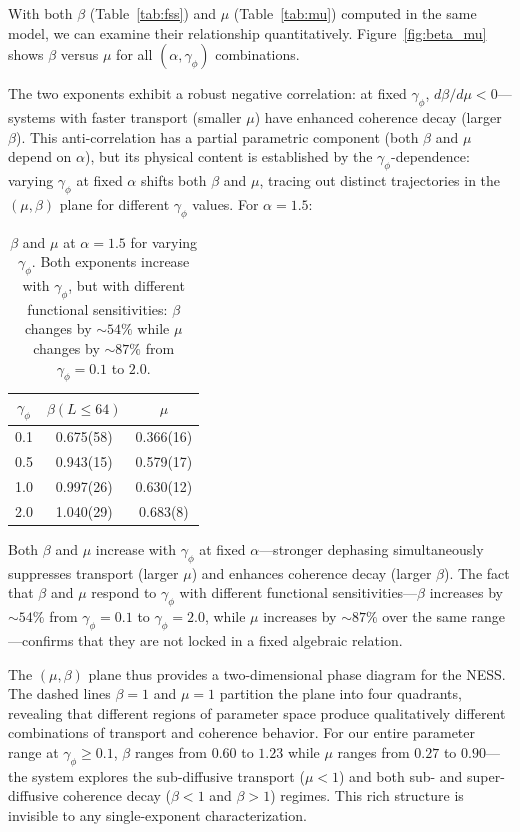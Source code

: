 \documentclass[aps,prb,twocolumn,superscriptaddress,floatfix]{revtex4-2}
\begin{document}
With both $\beta$ (Table~\ref{tab:fss}) and $\mu$ (Table~\ref{tab:mu}) computed in the same model, we can examine their relationship quantitatively. Figure~\ref{fig:beta_mu} shows $\beta$ versus $\mu$ for all $(\alpha, \gamma_\phi)$ combinations.

The two exponents exhibit a robust negative correlation: at fixed $\gamma_\phi$, $d\beta/d\mu < 0$---systems with faster transport (smaller $\mu$) have enhanced coherence decay (larger $\beta$). This anti-correlation has a partial parametric component (both $\beta$ and $\mu$ depend on $\alpha$), but its physical content is established by the $\gamma_\phi$-dependence: varying $\gamma_\phi$ at fixed $\alpha$ shifts both $\beta$ and $\mu$, tracing out distinct trajectories in the $(\mu, \beta)$ plane for different $\gamma_\phi$ values. For $\alpha = 1.5$:

\begin{table}[tbp]
\caption{$\beta$ and $\mu$ at $\alpha = 1.5$ for varying $\gamma_\phi$. Both exponents increase with $\gamma_\phi$, but with different functional sensitivities: $\beta$ changes by $\sim 54\%$ while $\mu$ changes by $\sim 87\%$ from $\gamma_\phi = 0.1$ to $2.0$.}
\label{tab:beta_mu_compare}
\begin{ruledtabular}
\begin{tabular}{ccc}
$\gamma_\phi$ & $\beta(L \le 64)$ & $\mu$ \\
\hline
0.1 & 0.675(58) & 0.366(16) \\
0.5 & 0.943(15) & 0.579(17) \\
1.0 & 0.997(26) & 0.630(12) \\
2.0 & 1.040(29) & 0.683(8)
\end{tabular}
\end{ruledtabular}
\end{table}

Both $\beta$ and $\mu$ increase with $\gamma_\phi$ at fixed $\alpha$---stronger dephasing simultaneously suppresses transport (larger $\mu$) and enhances coherence decay (larger $\beta$). The fact that $\beta$ and $\mu$ respond to $\gamma_\phi$ with different functional sensitivities---$\beta$ increases by $\sim 54\%$ from $\gamma_\phi = 0.1$ to $\gamma_\phi = 2.0$, while $\mu$ increases by $\sim 87\%$ over the same range---confirms that they are not locked in a fixed algebraic relation.

The $(\mu, \beta)$ plane thus provides a two-dimensional phase diagram for the NESS. The dashed lines $\beta = 1$ and $\mu = 1$ partition the plane into four quadrants, revealing that different regions of parameter space produce qualitatively different combinations of transport and coherence behavior. For our entire parameter range at $\gamma_\phi \ge 0.1$, $\beta$ ranges from $0.60$ to $1.23$ while $\mu$ ranges from $0.27$ to $0.90$---the system explores the sub-diffusive transport ($\mu < 1$) and both sub- and super-diffusive coherence decay ($\beta < 1$ and $\beta > 1$) regimes. This rich structure is invisible to any single-exponent characterization.
\end{document}
